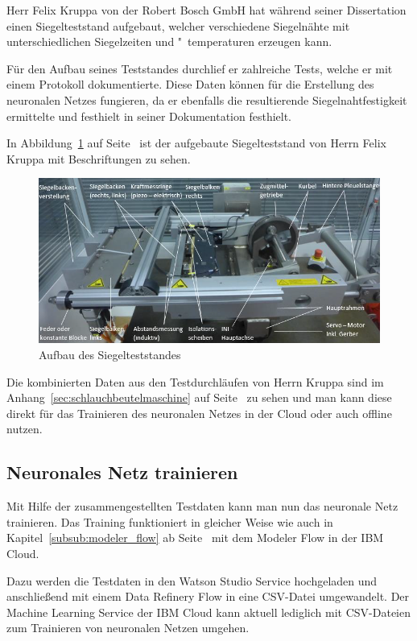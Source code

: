 Herr Felix Kruppa von der Robert Bosch GmbH hat während seiner Dissertation einen Siegelteststand aufgebaut, welcher
verschiedene Siegelnähte mit unterschiedlichen Siegelzeiten und "~temperaturen erzeugen kann.

Für den Aufbau seines Teststandes durchlief er zahlreiche Tests, welche er mit einem Protokoll dokumentierte. Diese
Daten können für die Erstellung des neuronalen Netzes fungieren, da er ebenfalls die resultierende Siegelnahtfestigkeit
ermittelte und festhielt in seiner Dokumentation festhielt.

In Abbildung~\ref{fig:siegelmaschinen_vffs_simulator} auf Seite~\pageref{fig:siegelmaschinen_vffs_simulator} ist der
aufgebaute Siegelteststand von Herrn Felix Kruppa mit Beschriftungen zu sehen.

\begin{figure}[h]
    \centering
    \includegraphics[width=\textwidth]{images/kapitel_5/vffs_simulator.png}
    \caption{Aufbau des Siegelteststandes}
    \label{fig:siegelmaschinen_vffs_simulator}
\end{figure}

Die kombinierten Daten aus den Testdurchläufen von Herrn Kruppa sind im Anhang~\ref{sec:schlauchbeutelmaschine}
auf Seite~\pageref{sec:schlauchbeutelmaschine} zu sehen und man kann diese direkt für das Trainieren des neuronalen
Netzes in der Cloud oder auch offline nutzen.

\subsection{Neuronales Netz trainieren}
Mit Hilfe der zusammengestellten Testdaten kann man nun das neuronale Netz trainieren. Das Training funktioniert in
gleicher Weise wie auch in Kapitel~\ref{subsub:modeler_flow} ab Seite~\pageref{subsub:modeler_flow} mit dem Modeler
Flow in der IBM Cloud.

Dazu werden die Testdaten in den Watson Studio Service hochgeladen und anschließend mit einem Data Refinery Flow in eine
CSV-Datei umgewandelt. Der Machine Learning Service der IBM Cloud kann aktuell lediglich mit CSV-Dateien zum Trainieren
von neuronalen Netzen umgehen.

